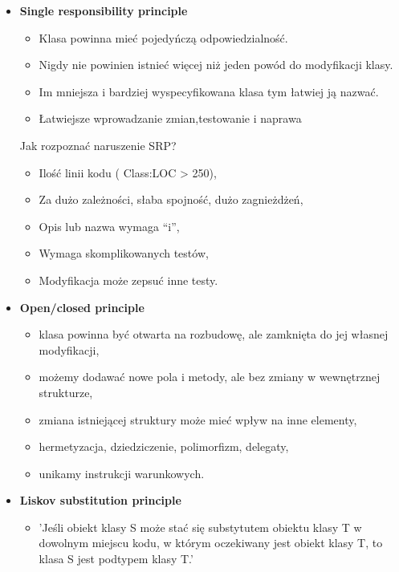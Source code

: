 \documentclass[../main.tex]{subfiles}
\begin{document}
    \begin{itemize}
        \item \textbf{Single responsibility principle}
        \begin{itemize}
            \item Klasa powinna mieć pojedyńczą odpowiedzialność.
            \item Nigdy nie powinien istnieć więcej niż jeden powód do modyfikacji klasy.
            \item Im mniejsza i bardziej wyspecyfikowana klasa tym łatwiej ją nazwać.
            \item Łatwiejsze wprowadzanie zmian,testowanie i naprawa
        \end{itemize}
        Jak rozpoznać naruszenie SRP?
        \begin{itemize}
            \item Ilość linii kodu ( Class:LOC > 250),
            \item Za dużo zależności, słaba spojność, dużo zagnieżdżeń,
            \item Opis lub nazwa wymaga “i”,
            \item Wymaga skomplikowanych testów,
            \item Modyfikacja może zepsuć inne testy.
        \end{itemize}
        \item \textbf{Open/closed principle}
        \begin{itemize}
            \item klasa powinna być otwarta na rozbudowę, ale zamknięta do jej własnej modyfikacji,
            \item możemy dodawać nowe pola i metody, ale bez zmiany w wewnętrznej strukturze,
            \item zmiana istniejącej struktury może mieć wpływ na inne elementy,
            \item hermetyzacja, dziedziczenie, polimorfizm, delegaty,
            \item unikamy instrukcji warunkowych.
        \end{itemize}
        \item \textbf{Liskov substitution principle}
        \begin{itemize}
            \item 'Jeśli obiekt klasy S może stać się substytutem obiektu klasy T w
            dowolnym miejscu kodu, w którym oczekiwany jest obiekt klasy T, to klasa S jest podtypem klasy T.'
        \end{itemize}

\end{itemize}
\end{document}
